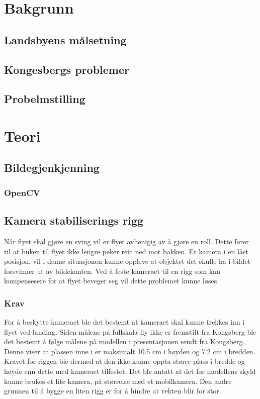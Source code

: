 \documentclass[a4paper, 11pt]{article}
\begin{document}
\newpage
\section{Bakgrunn}
\subsection{Landsbyens målsetning}
 
\subsection{Kongesbergs problemer}

\subsection{Probelmstilling}

\newpage
\section{Teori}
\subsection{Bildegjenkjenning}
\subsubsection{OpenCV}

\subsection{Kamera stabiliserings rigg}
Når flyet skal gjøre en sving vil er flyet avhenigig av å gjøre en roll. Dette fører til at buken til flyet ikke lengre peker rett ned mot bakken. Et kamera i en låst posisjon, vil i denne situasjonen kunne oppleve at objektet det skulle ha i bildet forsvinner ut av bildekanten. Ved å feste kameraet til en rigg som kan kompensesere for at flyet beveger seg vil dette problemet kunne løses. 

\subsubsection{Krav}
For å beskytte kameraet ble det bestemt at kameraet skal kunne trekkes inn i flyet ved landing. Siden målene på fullskala fly ikke er fremstilt fra Kongsberg ble det bestemt å følge målene på modellen i presentasjonen sendt fra Kongsberg. Denne viser at plassen inne i er maksimalt 10.5 cm i høyden og 7.2 cm i bredden. Kravet for riggen ble dermed at den ikke kunne oppta større plass i bredde og høyde enn dette med kameraet tilfestet. Det ble antatt at det for modellens skyld kunne brukes et lite kamera, på størrelse med et mobilkamera. Den andre grunnen til å bygge en liten rigg er for å hindre at vekten blir for stor.
 
\end{document}
